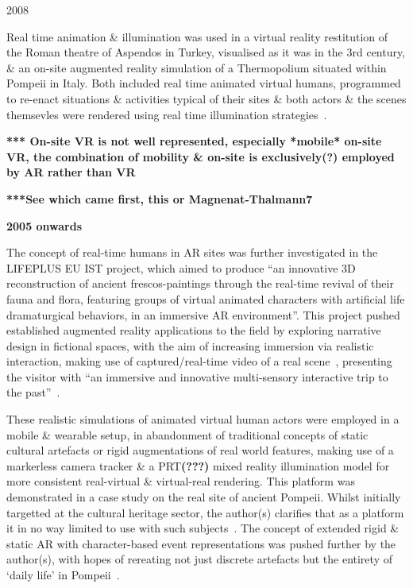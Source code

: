 
2008

Real time animation \& illumination was used in a virtual reality restitution of the Roman theatre of Aspendos in Turkey, visualised as it was in the 3rd century, \& an on-site augmented reality simulation of a Thermopolium situated within Pompeii in Italy. Both included real time animated virtual humans, programmed to re-enact situations \& activities typical of their sites \& both actors \& the scenes themsevles were rendered using real time illumination strategies~\cite{Magnenat-Thalmann7}.


\textbf{*** On-site VR is not well represented, especially *mobile* on-site VR, the combination of mobility \& on-site is exclusively(?) employed by AR rather than VR}


\textbf{***See which came first, this or Magnenat-Thalmann7}

\textbf{2005 onwards}

The concept of real-time humans in AR sites was further investigated in the LIFEPLUS EU IST project, which aimed to produce ``an innovative 3D reconstruction of ancient frescos-paintings through the real-time revival of their fauna and flora, featuring groups of virtual animated characters with artificial life dramaturgical behaviors, in an immersive AR environment''. This project pushed established augmented reality applications to the field by exploring narrative design in fictional spaces, with the aim of increasing immersion via realistic interaction, making use of captured/real-time video of a real scene~\cite{Papagiannakis2004}, presenting the visitor with ``an immersive and innovative multi-sensory interactive trip to the past''~\cite{Papagiannakis2005}.

These realistic simulations of animated virtual human actors were employed in a mobile \& wearable setup, in abandonment of traditional concepts of static cultural artefacts or rigid augmentations of real world features, making use of a markerless camera tracker \& a PRT\textbf{(???)} mixed reality illumination model for more consistent real-virtual \& virtual-real rendering. This platform was demonstrated in a case study on the real site of ancient Pompeii. Whilst initially targetted at the cultural heritage sector, the author(s) clarifies that as a platform it in no way limited to use with such subjects~\cite{Papagiannakis2007}. The concept of extended rigid \& static AR with character-based event representations was pushed further by the author(s), with hopes of rereating not just discrete artefacts but the entirety of `daily life' in Pompeii~\cite{Papagiannakis2009}.

